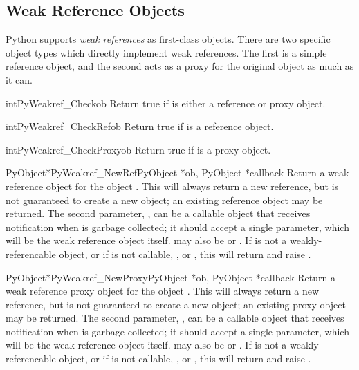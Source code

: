 \subsection{Weak Reference Objects \label{weakref-objects}}

Python supports \emph{weak references} as first-class objects.  There
are two specific object types which directly implement weak
references.  The first is a simple reference object, and the second
acts as a proxy for the original object as much as it can.

\begin{cfuncdesc}{int}{PyWeakref_Check}{ob}
  Return true if  is either a reference or proxy object.
\end{cfuncdesc}

\begin{cfuncdesc}{int}{PyWeakref_CheckRef}{ob}
  Return true if  is a reference object.
\end{cfuncdesc}

\begin{cfuncdesc}{int}{PyWeakref_CheckProxy}{ob}
  Return true if  is a proxy object.
\end{cfuncdesc}

\begin{cfuncdesc}{PyObject*}{PyWeakref_NewRef}{PyObject *ob,
                                               PyObject *callback}
  Return a weak reference object for the object .  This will
  always return a new reference, but is not guaranteed to create a new
  object; an existing reference object may be returned.  The second
  parameter, , can be a callable object that receives
  notification when  is garbage collected; it should accept a
  single parameter, which will be the weak reference object itself.
   may also be  or \NULL{}.  If 
  is not a weakly-referencable object, or if  is not
  callable, , or \NULL{}, this will return \NULL{} and
  raise .
\end{cfuncdesc}

\begin{cfuncdesc}{PyObject*}{PyWeakref_NewProxy}{PyObject *ob,
                                                 PyObject *callback}
  Return a weak reference proxy object for the object .  This
  will always return a new reference, but is not guaranteed to create
  a new object; an existing proxy object may be returned.  The second
  parameter, , can be a callable object that receives
  notification when  is garbage collected; it should accept a
  single parameter, which will be the weak reference object itself.
   may also be  or \NULL{}.  If  is not
  a weakly-referencable object, or if  is not callable,
  , or \NULL{}, this will return \NULL{} and raise
  .
\end{cfuncdesc}

